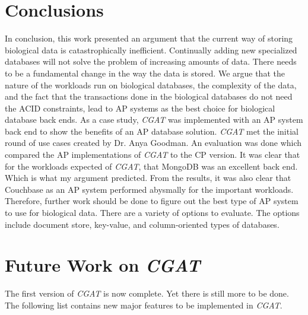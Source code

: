 \documentclass[12pt]{ucthesis}
\begin{document}
\section{Conclusions}
In conclusion, this work presented an argument that the current way of storing biological data is 
catastrophically inefficient.
Continually adding new specialized databases will not solve the problem of increasing amounts of data.
There needs to be a fundamental change in the way the data is stored. We argue that the
nature of the workloads run on biological databases, the complexity of the data, and the fact that the transactions done in the biological databases do not need the ACID constraints, lead to AP systems as the best choice for biological database back ends. As a case study, \textit{CGAT} was implemented with an AP system back end to show the benefits of an AP database solution. \textit{CGAT} met
the initial round of use cases created by Dr. Anya Goodman. An evaluation was done which compared the AP implementations of \textit{CGAT} to the CP version. It was clear that for the workloads expected of \textit{CGAT}, that MongoDB was an excellent back end. Which is what my argument predicted. From the results, it was
also clear that Couchbase as an AP system performed abysmally for the important workloads. Therefore, 
further work should be done to figure out the best type of AP system to use for biological data. There are
a variety of options to evaluate. The options include document store, key-value, and column-oriented types
of databases.

\section{Future Work on \textit{CGAT}}
The first version of \textit{CGAT} is now complete. Yet there is still more
to be done. The following list contains new major features to be implemented in \textit{CGAT}.
\end{document}
